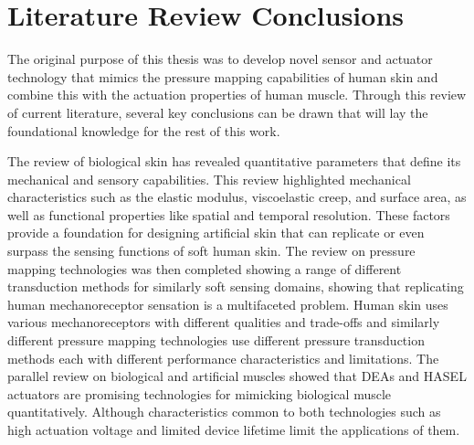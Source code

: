 



\newpage
\section{Literature Review Conclusions}
The original purpose of this thesis was to develop novel sensor and actuator technology that mimics the pressure mapping capabilities of human skin and combine this with the actuation properties of human muscle. Through this review of current literature, several key conclusions can be drawn that will lay the foundational knowledge for the rest of this work.

The review of biological skin has revealed quantitative parameters that define its mechanical and sensory capabilities. This review highlighted mechanical characteristics such as the elastic modulus, viscoelastic creep, and surface area, as well as functional properties like spatial and temporal resolution. These factors provide a foundation for designing artificial skin that can replicate or even surpass the sensing functions of soft human skin. The review on pressure mapping technologies was then completed showing a range of different transduction methods for similarly soft sensing domains, showing that replicating human mechanoreceptor sensation is a multifaceted problem. Human skin uses various mechanoreceptors with different qualities and trade-offs and similarly different pressure mapping technologies use different pressure transduction methods each with different performance characteristics and limitations. The parallel review on biological and artificial muscles showed that DEAs and HASEL actuators are promising technologies for mimicking biological muscle quantitatively. Although characteristics common to both technologies such as high actuation voltage and limited device lifetime limit the applications of them.


